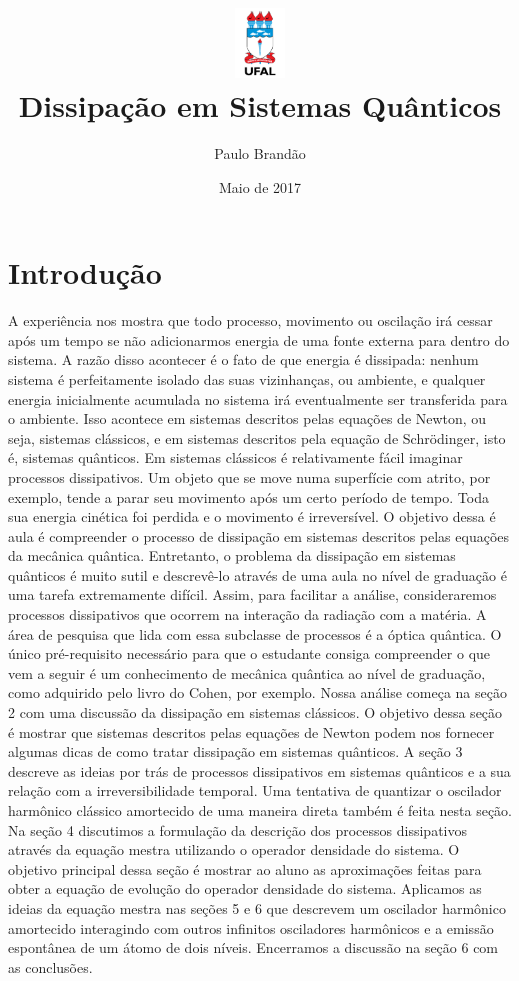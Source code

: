 \documentclass{article}
\title{\includegraphics[width=0.1\textwidth]{ufallogo.png} \\
\Huge{\color{astral}\textbf{Dissipação em Sistemas Quânticos}}}
\author{Paulo Brandão}
\date{Maio de 2017}
\begin{document}
\maketitle

\section{Introdução}

A experiência nos mostra que todo processo, movimento ou oscilação irá cessar após um tempo se não adicionarmos energia de uma fonte externa para dentro do sistema. A razão disso acontecer é o fato de que energia é dissipada: nenhum sistema é perfeitamente isolado das suas vizinhanças, ou ambiente, e qualquer energia inicialmente acumulada no sistema irá eventualmente ser transferida para o ambiente. Isso acontece em sistemas descritos pelas equações de Newton, ou seja, sistemas clássicos, e em sistemas descritos pela equação de Schrödinger, isto é, sistemas quânticos. Em sistemas clássicos é relativamente fácil imaginar processos dissipativos. Um objeto que se move numa superfície com atrito, por exemplo, tende a parar seu movimento após um certo período de tempo. Toda sua energia cinética foi perdida e o movimento é irreversível. O objetivo dessa é aula é compreender o processo de dissipação em sistemas descritos pelas equações da mecânica quântica. Entretanto, o problema da dissipação em sistemas quânticos é muito sutil e descrevê-lo através de uma aula no nível de graduação é uma tarefa extremamente difícil. Assim, para facilitar a análise, consideraremos processos dissipativos que ocorrem na interação da radiação com a matéria. A área de pesquisa que lida com essa subclasse de processos é a óptica quântica. O único pré-requisito necessário para que o estudante consiga compreender o que vem a seguir é um conhecimento de mecânica quântica ao nível de graduação, como adquirido pelo livro do Cohen, por exemplo. Nossa análise começa na seção 2 com uma discussão da dissipação em sistemas clássicos. O objetivo dessa seção é mostrar que sistemas descritos pelas equações de Newton podem nos fornecer algumas dicas de como tratar dissipação em sistemas quânticos. A seção 3 descreve as ideias por trás de processos dissipativos em sistemas quânticos e a sua relação com a irreversibilidade temporal. Uma tentativa de quantizar o oscilador harmônico clássico amortecido de uma maneira direta também é feita nesta seção. Na seção 4 discutimos a formulação da descrição dos processos dissipativos através da equação mestra utilizando o operador densidade do sistema. O objetivo principal dessa seção é mostrar ao aluno as aproximações feitas para obter a equação de evolução do operador densidade do sistema. Aplicamos as ideias da equação mestra nas seções 5 e 6 que descrevem um oscilador harmônico amortecido interagindo com outros infinitos osciladores harmônicos e a emissão espontânea de um átomo de dois níveis. Encerramos a discussão na seção 6 com as conclusões.
\end{document}
